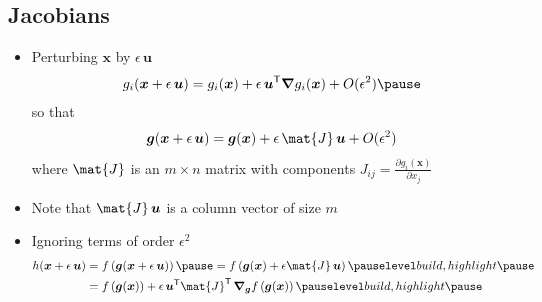 \begin{slide}
\section[-2]{Jacobians}

\begin{PauseHighLight}
  \begin{itemize}
  \item Perturbing $\bm{x}$ by $\epsilon\, \bm{u}$
    \begin{align*}
      g_i(\bm{x}+\epsilon \, \bm{u}) = g_i(\bm{x}) + \epsilon\,
      \bm{u}^\tr \grad g_i(\bm{x}) + O(\epsilon^2)\pause
    \end{align*}
    so that
    \begin{align*}
      \bm{g}(\bm{x}+\epsilon \, \bm{u}) = \bm{g}(\bm{x}) +
      \epsilon\, \mat{J} \,\bm{u}  + O(\epsilon^2)
    \end{align*}
    where $\mat{J}$ is an $m\times n$ matrix with components $J_{ij}=
    \frac{\partial g_i(\bm{x})}{\partial x_j}$\pause
  \item Note that $\mat{J}\, \bm{u}$ is a column vector of size $m$\pause
  \item Ignoring terms of order $\epsilon^2$
    \begin{align*}
      h(\bm{x}+\epsilon \, \bm{u}) &= f\bra{\bm{g}(\bm{x} +
                                       \epsilon \, \bm{u})}\pause
      = f\bra{\bm{g}(\bm{x}) + \epsilon \mat{J}\, \bm{u}}\pauseb \\
      &= f\bra{\bm{g}(\bm{x})} + \epsilon\, \bm{u}^\tr \mat{J}^\tr \, \grad_{\bm{g}}
        f\bra{\bm{g}(\bm{x})} \pauseb
    \end{align*}
  \end{itemize}
\end{PauseHighLight}

\end{slide}



